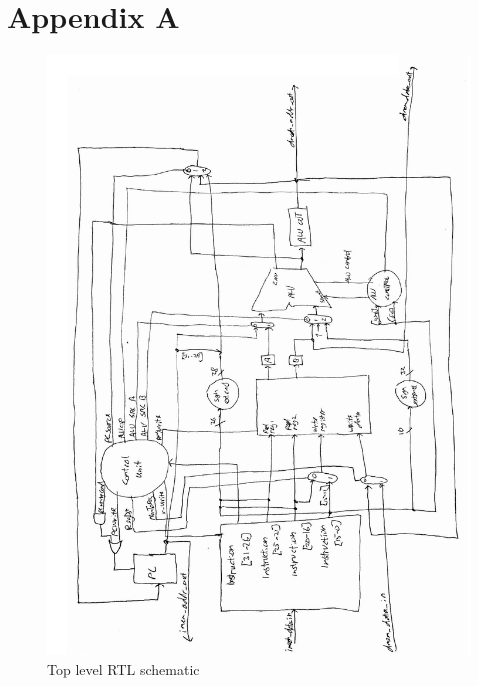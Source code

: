 \section{Appendix A}

\begin{figure}[ht!]
    \begin{center}
    \includegraphics[width=\textwidth]{assets/top_level_rtl.pdf}
    \caption{Top level RTL schematic}
    \label{fig:top_level_rtl}
    \end{center}
\end{figure}
